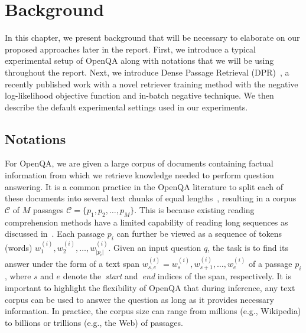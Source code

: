
\chapter{Background} %
\label{ch:background}


In this chapter, we present background that will be necessary to elaborate on our proposed approaches later in the report.
%
First, we introduce a typical experimental setup of OpenQA along with notations that we will be using throughout the report.
%
Next, we introduce Dense Passage Retrieval (DPR)~\cite{karpukhin2020dense}, a recently published work with a novel retriever training method with the negative log-likelihood objective function and in-batch negative technique.
%
We then describe the default experimental settings used in our experiments.
%



\section{Notations}\label{sec:notations}
%
For OpenQA, we are given a large corpus of documents containing factual information from which we retrieve knowledge needed to perform question answering.
%
It is a common practice in the OpenQA literature to split each of these documents into several text chunks of equal lengths~\cite{karpukhin2020dense, wang2019multi, lewis2020retrieval, xiong2020approximate, fajcik2021pruning, izacard2020distilling, izacard2021leveraging}, resulting in a corpus $\mathcal{C}$ of $M$ passages $\mathcal{C} = \{p_1, p_2, \ldots, p_M\}$.
%
This is because existing reading comprehension methods have a limited capability of reading long sequences as discussed in~.
%
Each passage $p_i$ can further be viewed as a sequence of tokens (words) $w_1^{(i)}, w_2^{(i)}, \ldots, w_{\vert p_i \vert}^{(i)}$.
%
Given an input question $q$, the task is to find its answer under the form of a text span $w_{s, e}^{(i)} = w_s^{(i)}, w_{s + 1}^{(i)}, \ldots, w_e^{(i)}$ of a passage $p_i$, where $s$ and $e$ denote the~\emph{start} and~\emph{end} indices of the span, respectively.
%
It is important to highlight the flexibility of OpenQA that during inference, any text corpus can be used to answer the question as long as it provides necessary information.
%
In practice, the corpus size can range from millions (e.g., Wikipedia) to billions or trillions (e.g., the Web) of passages.

